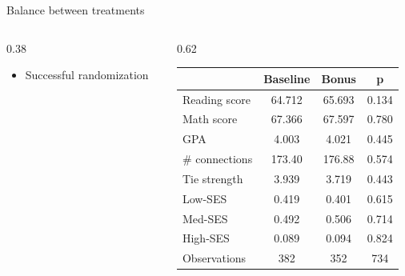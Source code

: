 \documentclass[aspectratio=169,xcolor=dvipsnames]{beamer}
\begin{document}
\begin{frame}{Balance between treatments}
    \begin{columns}[T]  %
        \begin{column}{0.38\textwidth}  %
            \vspace{2em}  %
            \begin{itemize}
                \item Successful randomization
            \end{itemize}
        \end{column}
        \begin{column}{0.62\textwidth}  %
            \begin{table}
                \centering
                \begin{threeparttable}
                \begin{tabular*}{0.9\columnwidth}{@{\extracolsep{\fill}}lcc c@{}}
                \toprule
                & \multicolumn{1}{c}{\textbf{Baseline}} & \multicolumn{1}{c}{\textbf{Bonus}} & \multicolumn{1}{c}{\textbf{p}} \\
                \midrule
                Reading score & 64.712 & 65.693 & 0.134 \\
                Math score & 67.366 & 67.597 & 0.780 \\
                GPA & 4.003 & 4.021 & 0.445 \\
                \# connections & 173.40 & 176.88 & 0.574 \\
                Tie strength & 3.939 & 3.719 & 0.443 \\
                Low-SES & 0.419 & 0.401 & 0.615 \\
                Med-SES & 0.492 & 0.506 & 0.714 \\
                High-SES & 0.089 & 0.094 & 0.824 \\
                \midrule
                Observations & 382 & 352 & 734 \\
                \bottomrule
                \end{tabular*}
                \label{tab:balance}
                \end{threeparttable}
            \end{table}
        \end{column}
    \end{columns}
\end{frame}
\end{document}
